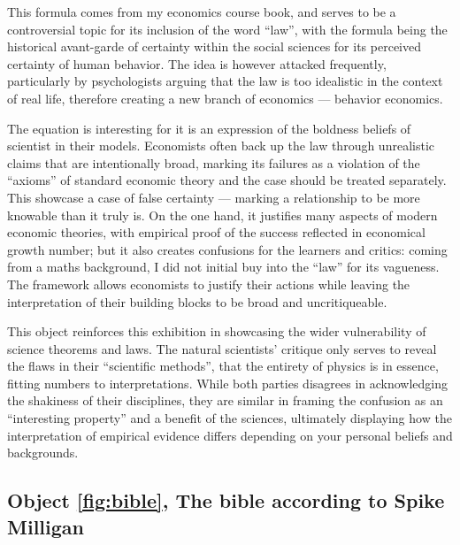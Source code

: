 \documentclass[a4paper,12pt]{article}
\begin{document}
This formula comes from my economics course book, and serves to be a controversial topic for its inclusion of the word ``law'', with the formula being the historical avant-garde of certainty within the social sciences for its perceived certainty of human behavior. The idea is however attacked frequently, particularly by psychologists arguing that the law is too idealistic in the context of real life, therefore creating a new branch of economics --- behavior economics.

The equation is interesting for it is an expression of the boldness beliefs of scientist in their models. Economists often back up the law through unrealistic claims that are intentionally broad, marking its failures as a violation of the ``axioms'' of standard economic theory and the case should be treated separately. This showcase a case of false certainty --- marking a relationship to be more knowable than it truly is. On the one hand, it justifies many aspects of modern economic theories, with empirical proof of the success reflected in economical growth number; but it also creates confusions for the learners and critics: coming from a maths background, I did not initial buy into the ``law'' for its vagueness. The framework allows economists to justify their actions while leaving the interpretation of their building blocks to be broad and uncritiqueable.

This object reinforces this exhibition in showcasing the wider vulnerability of science theorems and laws. The natural scientists' critique only serves to reveal the flaws in their ``scientific methods'', that the entirety of physics is in essence, fitting numbers to interpretations. While both parties disagrees in acknowledging the shakiness of their disciplines, they are similar in framing the confusion as an ``interesting property'' and a benefit of the sciences, ultimately displaying how the interpretation of empirical evidence differs depending on your personal beliefs and backgrounds.

\subsection*{Object \ref{fig:bible}, The bible according to Spike Milligan}
\end{document}
